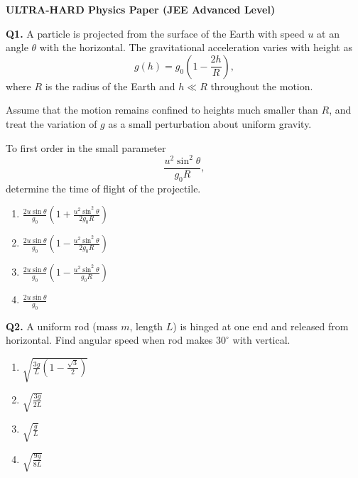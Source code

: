 \documentclass[12pt]{article}
\begin{document}
\begin{center}
\Large \textbf{ULTRA-HARD Physics Paper (JEE Advanced Level)}
\end{center}

\textbf{Q1.}  
A particle is projected from the surface of the Earth with speed $u$ at an angle $\theta$ with the horizontal.  
The gravitational acceleration varies with height as  
\[
g(h)=g_0\left(1-\frac{2h}{R}\right),
\]
where $R$ is the radius of the Earth and $h \ll R$ throughout the motion.  

Assume that the motion remains confined to heights much smaller than $R$, and treat the variation of $g$ as a small perturbation about uniform gravity.  

To first order in the small parameter  
\[
\frac{u^2\sin^2\theta}{g_0R},
\]
determine the time of flight of the projectile.

\begin{enumerate}[label=(\Alph*)]
\item $\displaystyle \frac{2u\sin\theta}{g_0}
\left(1+\frac{u^2\sin^2\theta}{2g_0R}\right)$

\item $\displaystyle \frac{2u\sin\theta}{g_0}
\left(1-\frac{u^2\sin^2\theta}{2g_0R}\right)$

\item $\displaystyle \frac{2u\sin\theta}{g_0}
\left(1-\frac{u^2\sin^2\theta}{g_0R}\right)$

\item $\displaystyle \frac{2u\sin\theta}{g_0}$
\end{enumerate}
\textbf{Q2.}  
A uniform rod (mass $m$, length $L$) is hinged at one end and released from horizontal.  
Find angular speed when rod makes $30^\circ$ with vertical.

\begin{center}
\end{center}

\begin{enumerate}[label=(\Alph*)]
\item $\displaystyle \sqrt{\frac{3g}{L}\left(1-\frac{\sqrt{3}}{2}\right)}$
\item $\displaystyle \sqrt{\frac{3g}{2L}}$
\item $\displaystyle \sqrt{\frac{g}{L}}$
\item $\displaystyle \sqrt{\frac{9g}{8L}}$
\end{enumerate}
\end{document}
